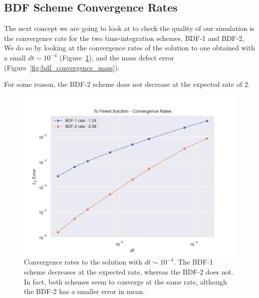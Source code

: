 \documentclass[../../thesis.tex]{subfiles}
\begin{document}
\subsection{BDF Scheme Convergence Rates}
\label{sec:fom_calibration_bdf_convergence_rates}
The next concept we are going to look at to check the quality of our simulation is 
the convergence rate for the two time-integration schemes, 
BDF-1 and BDF-2, 
We do so by looking at the convergence rates of the solution to one obtained
with a small $dt\sim 10^{-4}$ (Figure~\ref{fig:bdf_convergence_solutions}),
and the mass defect error (Figure~\ref{fig:bdf_convergence_mass}).

For some reason, the BDF-2 scheme does not decrease at the expected rate of 2.
\begin{figure}[h]
    \centering
    \includegraphics[width=1\columnwidth]{research_project/piston/figures/bdf_convergence/convergence_finest_solution.png}
    \caption{Convergence rates to the solution with $dt\sim 10^{-4}$.
    The BDF-1 scheme decreases at the expected rate, whereas the BDF-2 does not.
    In fact, both schemes seem to converge at the same rate,
    although the BDF-2 has a smaller error in mean.}
    \label{fig:bdf_convergence_solutions}
\end{figure}
\end{document}
